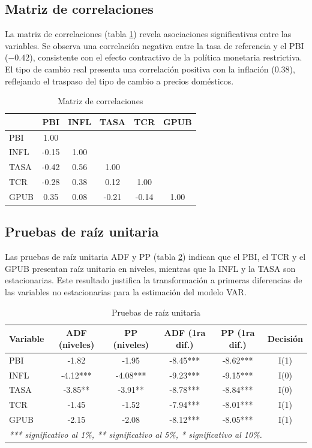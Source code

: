 \documentclass[12pt,a4paper]{article}
\begin{document}
\subsection{Matriz de correlaciones}

La matriz de correlaciones (tabla \ref{tab:correlaciones}) revela asociaciones significativas entre las variables. Se observa una correlación negativa entre la tasa de referencia y el PBI ($-0.42$), consistente con el efecto contractivo de la política monetaria restrictiva. El tipo de cambio real presenta una correlación positiva con la inflación (0.38), reflejando el traspaso del tipo de cambio a precios domésticos.

\begin{table}[H]
\centering
\caption{Matriz de correlaciones}
\label{tab:correlaciones}
\begin{tabular}{lccccc}
\toprule
& \textbf{PBI} & \textbf{INFL} & \textbf{TASA} & \textbf{TCR} & \textbf{GPUB}\\
\midrule
PBI & 1.00 & & & & \\
INFL & -0.15 & 1.00 & & & \\
TASA & -0.42 & 0.56 & 1.00 & & \\
TCR & -0.28 & 0.38 & 0.12 & 1.00 & \\
GPUB & 0.35 & 0.08 & -0.21 & -0.14 & 1.00\\
\bottomrule
\end{tabular}
\end{table}

\subsection{Pruebas de raíz unitaria}

Las pruebas de raíz unitaria ADF y PP (tabla \ref{tab:raiz_unitaria}) indican que el PBI, el TCR y el GPUB presentan raíz unitaria en niveles, mientras que la INFL y la TASA son estacionarias. Este resultado justifica la transformación a primeras diferencias de las variables no estacionarias para la estimación del modelo VAR.

\begin{table}[H]
\centering
\caption{Pruebas de raíz unitaria}
\label{tab:raiz_unitaria}
\begin{tabular}{lccccc}
\toprule
\textbf{Variable} & \textbf{ADF (niveles)} & \textbf{PP (niveles)} & \textbf{ADF (1ra dif.)} & \textbf{PP (1ra dif.)} & \textbf{Decisión}\\
\midrule
PBI & -1.82 & -1.95 & -8.45*** & -8.62*** & I(1)\\
INFL & -4.12*** & -4.08*** & -9.23*** & -9.15*** & I(0)\\
TASA & -3.85** & -3.91** & -8.78*** & -8.84*** & I(0)\\
TCR & -1.45 & -1.52 & -7.94*** & -8.01*** & I(1)\\
GPUB & -2.15 & -2.08 & -8.12*** & -8.05*** & I(1)\\
\bottomrule
\multicolumn{6}{l}{\textit{*** significativo al 1\%, ** significativo al 5\%, * significativo al 10\%.}}\\
\end{tabular}
\end{table}
\end{document}
